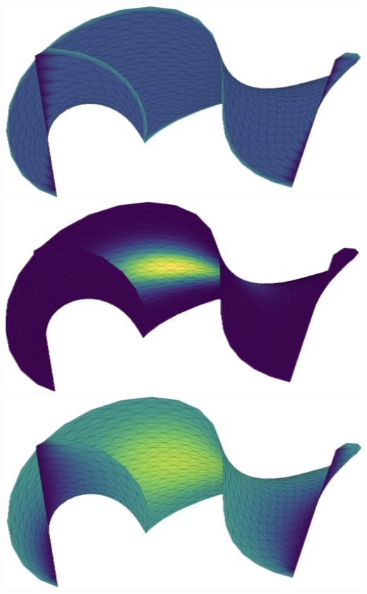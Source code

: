 \begin{center}
    \includegraphics[width=0.95\linewidth]{../images/helix_BC.png}
    \includegraphics[width=0.95\linewidth]{../images/helix_force.png}    
    \includegraphics[width=0.95\linewidth]{../images/helix_solution.png}
    \label{fig:helix}
\end{center}


